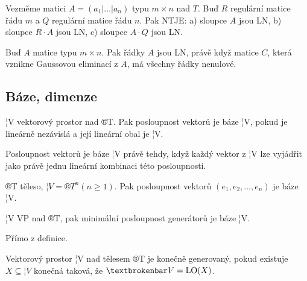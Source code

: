 \documentclass[12pt]{article}					%
\begin{document}
        \begin{tvrzeni}
            Vezměme matici $A = (a_1|…|a_n)$ typu $m \times n$ nad $T$. Buď $R$ regulární matice řádu $m$ a $Q$ regulární matice řádu $n$. Pak NTJE: a) sloupce $A$ jsou LN, b) sloupce $R·A$ jsou LN, c) sloupce $A·Q$ jsou LN.
        \end{tvrzeni}

        \begin{tvrzeni}
            Buď $A$ matice typu $m \times n$. Pak řádky $A$ jsou LN, právě když matice $C$, která vznikne Gaussovou eliminací z $A$, má všechny řádky nenulové.
        \end{tvrzeni}


    \subsection{Báze, dimenze}

        \begin{definice}[Báze]
            ¦V vektorový prostor nad ®T. Pak posloupnost vektorů je báze ¦V, pokud je lineárně nezávislá a její lineární obal je ¦V.
        \end{definice}
        \begin{dusledek}
            Posloupnost vektorů je báze ¦V právě tehdy, když každý vektor z ¦V lze vyjádřit jako právě jednu lineární kombinaci této posloupnosti.
        \end{dusledek}

        \begin{definice}
            ®T těleso, $¦V = ®T^n (n≥1)$. Pak posloupnost vektorů $(e_1, e_2, …, e_n)$ je báze ¦V.
        \end{definice}

        \begin{tvrzeni}
            ¦V VP nad ®T, pak minimální posloupnost generátorů je báze ¦V.
            \begin{dukazin}
                Přímo z definice.
            \end{dukazin}
        \end{tvrzeni}


        \begin{definice}
            Vektorový prostor ¦V nad tělesem ®T je konečně generovaný, pokud existuje $X \subseteq ¦V$ konečná taková, že $¦V = \LO(X)$.
        \end{definice}
\end{document}
